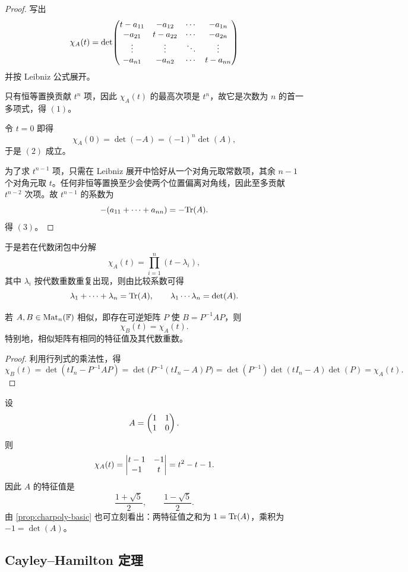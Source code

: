 \begin{proof}
写出
\[
\chi_A(t)=\det\!
\begin{pmatrix} 
 t-a_{11} & -a_{12} & \cdots & -a_{1n}\\
 -a_{21} & t-a_{22} & \cdots & -a_{2n}\\
 \vdots & \vdots & \ddots & \vdots\\
 -a_{n1} & -a_{n2} & \cdots & t-a_{nn} \end{pmatrix}
\]
并按 Leibniz 公式展开。

只有恒等置换贡献 \(t^n\) 项，因此 \(\chi_A(t)\) 的最高次项是 \(t^n\)，故它是次数为 \(n\) 的首一多项式，得 \((1)\)。

令 \(t=0\) 即得
\[
\chi_A(0)=\det(-A)=(-1)^n\det(A),
\]
于是 \((2)\) 成立。

为了求 \(t^{n-1}\) 项，只需在 Leibniz 展开中恰好从一个对角元取常数项，其余 \(n-1\) 个对角元取 \(t\)。任何非恒等置换至少会使两个位置偏离对角线，因此至多贡献 \(t^{n-2}\) 次项。故 \(t^{n-1}\) 的系数为
\[
-(a_{11}+\cdots+a_{nn})=-\mathrm{Tr}(A).
\]
得 \((3)\)。
\end{proof}

于是若在代数闭包中分解
\[
\chi_A(t)=\prod_{i=1}^n (t-\lambda_i),
\]
其中 \(\lambda_i\) 按代数重数重复出现，则由比较系数可得
\[
\lambda_1+\cdots+\lambda_n=\mathrm{Tr}(A),\qquad \lambda_1\cdots\lambda_n=\det(A).
\]

\begin{proposition}\label{prop:similar-charpoly}
若 \(A,B\in \mathrm{Mat}_n(\mathbb{F})\) 相似，即存在可逆矩阵 \(P\) 使 \(B=P^{-1}AP\)，则
\[
\chi_B(t)=\chi_A(t).
\]
特别地，相似矩阵有相同的特征值及其代数重数。
\end{proposition}

\begin{proof}
利用行列式的乘法性，得
\[
\chi_B(t)=\det(tI_n-P^{-1}AP)=\det\bigl(P^{-1}(tI_n-A)P\bigr)
=\det(P^{-1})\det(tI_n-A)\det(P)=\chi_A(t).
\]
\end{proof}

\begin{example}
设
\[
A=\begin{pmatrix} 1&1\\1&0 \end{pmatrix}.
\]
则
\[
\chi_A(t)=\begin{vmatrix} t-1&-1\\-1&t \end{vmatrix}=t^2-t-1.
\]
因此 \(A\) 的特征值是
\[
\frac{1+\sqrt5}{2},\qquad \frac{1-\sqrt5}{2}.
\]
由 \cref{prop:charpoly-basic} 也可立刻看出：两特征值之和为 \(1=\mathrm{Tr}(A)\)，乘积为 \(-1=\det(A)\)。
\end{example}

\subsection{Cayley--Hamilton 定理}

